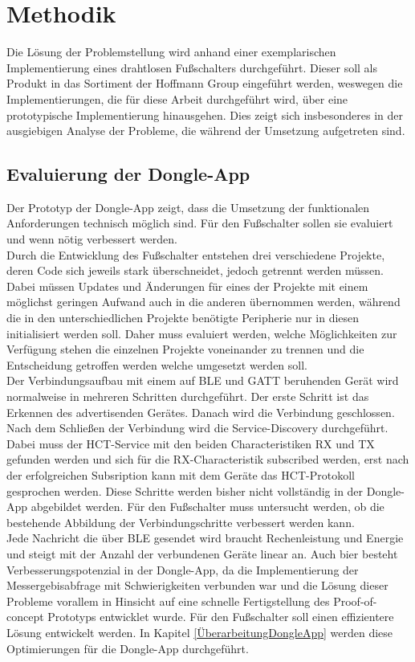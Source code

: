 \section{Methodik}
\label{Methodik}
Die Lösung der Problemstellung wird anhand einer exemplarischen Implementierung eines drahtlosen Fußschalters durchgeführt. Dieser soll als Produkt in das Sortiment der Hoffmann Group eingeführt werden, weswegen die Implementierungen, die für diese Arbeit durchgeführt wird, über eine prototypische Implementierung hinausgehen. Dies zeigt sich insbesonderes in der ausgiebigen Analyse der Probleme, die während der Umsetzung aufgetreten sind. 

\subsection{Evaluierung der Dongle-App}
Der Prototyp der Dongle-App zeigt, dass die Umsetzung der funktionalen Anforderungen technisch möglich sind. Für den Fußschalter sollen sie evaluiert und wenn nötig verbessert werden.\\
Durch die Entwicklung des Fußschalter entstehen drei verschiedene Projekte, deren Code sich jeweils stark überschneidet, jedoch getrennt werden müssen. Dabei müssen Updates und Änderungen für eines der Projekte mit einem möglichst geringen Aufwand auch in die anderen übernommen werden, während die in den unterschiedlichen Projekte benötigte Peripherie nur in diesen initialisiert werden soll. Daher muss evaluiert werden, welche Möglichkeiten zur Verfügung stehen die einzelnen Projekte voneinander zu trennen und die Entscheidung getroffen werden welche umgesetzt werden soll.\\
Der Verbindungsaufbau mit einem auf \ac{BLE} und \ac{GATT} beruhenden Gerät wird normalweise in mehreren Schritten durchgeführt. Der erste Schritt ist das Erkennen des advertisenden Gerätes. Danach wird die Verbindung geschlossen. Nach dem Schließen der Verbindung wird die Service-Discovery durchgeführt. Dabei muss der \ac{HCT}-Service mit den beiden Characteristiken RX und TX gefunden werden und sich für die RX-Characteristik subscribed werden, erst nach der erfolgreichen Subsription kann mit dem Geräte das \ac{HCT}-Protokoll gesprochen werden. Diese Schritte werden bisher nicht vollständig in der Dongle-App abgebildet werden. Für den Fußschalter muss untersucht werden, ob die bestehende Abbildung der Verbindungschritte verbessert werden kann.\\
Jede Nachricht die über \ac{BLE} gesendet wird braucht Rechenleistung und Energie und steigt mit der Anzahl der verbundenen Geräte linear an. Auch bier besteht Verbesserungspotenzial in der Dongle-App, da die Implementierung der Messergebisabfrage mit Schwierigkeiten verbunden war und die Lösung dieser Probleme vorallem in Hinsicht auf eine schnelle Fertigstellung des Proof-of-concept Prototyps entwicklet wurde. Für den Fußschalter soll einen effizientere Lösung entwickelt werden. In Kapitel \ref{ÜberarbeitungDongleApp} werden diese Optimierungen für die Dongle-App durchgeführt.

